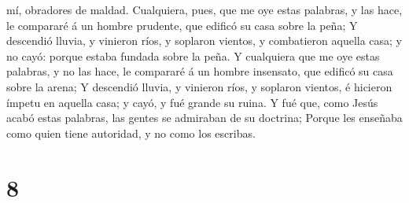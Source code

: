 mí, obradores de maldad.  Cualquiera, pues, que me oye
estas palabras, y las hace, le compararé á un hombre prudente, que
edificó su casa sobre la peña;  Y descendió lluvia, y
vinieron ríos, y soplaron vientos, y combatieron aquella casa; y no
cayó: porque estaba fundada sobre la peña.  Y cualquiera
que me oye estas palabras, y no las hace, le compararé á un hombre
insensato, que edificó su casa sobre la arena;  Y
descendió lluvia, y vinieron ríos, y soplaron vientos, é hicieron ímpetu
en aquella casa; y cayó, y fué grande su ruina.  Y fué
que, como Jesús acabó estas palabras, las gentes se admiraban de su
doctrina;  Porque les enseñaba como quien tiene
autoridad, y no como los escribas.

\hypertarget{section-7}{%
\section{8}\label{section-7}}

